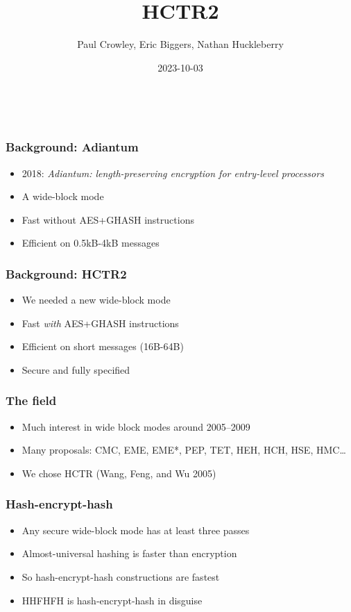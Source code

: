 \documentclass[aspectratio=169]{beamer}
\title{HCTR2}
\author{Paul Crowley, Eric Biggers, Nathan Huckleberry}
\institute{Google LLC}
\date{2023-10-03}
\newenvironment*{figslide}{
    \begin{columns}
        \begin{column}{.4\textwidth}

}{
\end{column}
\begin{column}{.6\textwidth}
    \begin{figure}
        
    \end{figure}
\end{column}
\end{columns}
}
\begin{document}
\begin{frame}
    \begin{figslide}
        \titlepage
    \end{figslide}
\end{frame}

\begin{frame}

\frametitle{Background: Adiantum}

\begin{itemize}
    \item 2018: \textit{Adiantum: length-preserving encryption for entry-level processors}
    \item A wide-block mode
    \item Fast without AES+GHASH instructions
    \item Efficient on 0.5kB-4kB messages
\end{itemize}
\end{frame}

\begin{frame}

    \frametitle{Background: HCTR2}
    
    \begin{itemize}
        \item We needed a new wide-block mode
        \item Fast \textit{with} AES+GHASH instructions
        \item Efficient on short messages (16B-64B)
        \item Secure and fully specified
    \end{itemize}
\end{frame}

\begin{frame}

\frametitle{The field}

\begin{itemize}
    \item Much interest in wide block modes around 2005--2009
    \item Many proposals: CMC, EME, EME*, PEP, TET, HEH, HCH, HSE, HMC\ldots
    \item We chose HCTR (Wang, Feng, and Wu 2005)
\end{itemize}
\end{frame}

\begin{frame}

\frametitle{Hash-encrypt-hash}

\begin{itemize}
    \item Any secure wide-block mode has at least three passes
    \item Almost-universal hashing is faster than encryption
    \item So hash-encrypt-hash constructions are fastest
    \item HHFHFH is hash-encrypt-hash in disguise
\end{itemize}
\end{frame}
\end{document}
